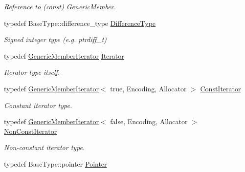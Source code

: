 \begin{DoxyCompactItemize}
\begin{DoxyCompactList}\small\item\em Reference to (const) \hyperlink{struct_generic_member}{Generic\+Member}. \end{DoxyCompactList}\item 
typedef Base\+Type\+::difference\+\_\+type \hyperlink{class_generic_member_iterator_a902b99c8ae351cd7626514dc5f30740a}{Difference\+Type}\hypertarget{class_generic_member_iterator_a902b99c8ae351cd7626514dc5f30740a}{}\label{class_generic_member_iterator_a902b99c8ae351cd7626514dc5f30740a}

\begin{DoxyCompactList}\small\item\em Signed integer type (e.\+g. {\ttfamily ptrdiff\+\_\+t}) \end{DoxyCompactList}\item 
typedef \hyperlink{class_generic_member_iterator}{Generic\+Member\+Iterator} \hyperlink{class_generic_member_iterator_ad1cf1ecf6210b47906c9f179c893a8b8}{Iterator}\hypertarget{class_generic_member_iterator_ad1cf1ecf6210b47906c9f179c893a8b8}{}\label{class_generic_member_iterator_ad1cf1ecf6210b47906c9f179c893a8b8}

\begin{DoxyCompactList}\small\item\em Iterator type itself. \end{DoxyCompactList}\item 
typedef \hyperlink{class_generic_member_iterator}{Generic\+Member\+Iterator}$<$ true, Encoding, Allocator $>$ \hyperlink{class_generic_member_iterator_ae5be27a73dce0be58ee2776db896d591}{Const\+Iterator}\hypertarget{class_generic_member_iterator_ae5be27a73dce0be58ee2776db896d591}{}\label{class_generic_member_iterator_ae5be27a73dce0be58ee2776db896d591}

\begin{DoxyCompactList}\small\item\em Constant iterator type. \end{DoxyCompactList}\item 
typedef \hyperlink{class_generic_member_iterator}{Generic\+Member\+Iterator}$<$ false, Encoding, Allocator $>$ \hyperlink{class_generic_member_iterator_abc26eb06f2962765b11dcd06ce84ac02}{Non\+Const\+Iterator}\hypertarget{class_generic_member_iterator_abc26eb06f2962765b11dcd06ce84ac02}{}\label{class_generic_member_iterator_abc26eb06f2962765b11dcd06ce84ac02}

\begin{DoxyCompactList}\small\item\em Non-\/constant iterator type. \end{DoxyCompactList}\item 
typedef Base\+Type\+::pointer \hyperlink{class_generic_member_iterator_ac69f141f1fde31c1f550f524a69c5de9}{Pointer}\hypertarget{class_generic_member_iterator_ac69f141f1fde31c1f550f524a69c5de9}{}\label{class_generic_member_iterator_ac69f141f1fde31c1f550f524a69c5de9}


\end{DoxyCompactItemize}
